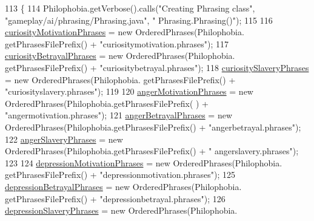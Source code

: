 \begin{DoxyCode}
113                       \{
114         Philophobia.getVerbose().calls(\textcolor{stringliteral}{"Creating Phrasing class"}, \textcolor{stringliteral}{"gameplay/ai/phrasing/Phrasing.java"}, \textcolor{stringliteral}{"
      Phrasing.Phrasing()"});
115 
116         \hyperlink{classgameplay_1_1ai_1_1phrasing_1_1_phrasing_ad82ede6d0263d91e13511606f6696a18}{curiosityMotivationPhrases} = \textcolor{keyword}{new} OrderedPhrases(Philophobia.
      getPhrasesFilePrefix() + \textcolor{stringliteral}{"curiositymotivation.phrases"});
117         \hyperlink{classgameplay_1_1ai_1_1phrasing_1_1_phrasing_a10f436b3727af6eedab39a382801306c}{curiosityBetrayalPhrases} = \textcolor{keyword}{new} OrderedPhrases(Philophobia.
      getPhrasesFilePrefix() + \textcolor{stringliteral}{"curiositybetrayal.phrases"});
118         \hyperlink{classgameplay_1_1ai_1_1phrasing_1_1_phrasing_a2e35ff33685cec980af1454e7f255d06}{curiositySlaveryPhrases} = \textcolor{keyword}{new} OrderedPhrases(Philophobia.
      getPhrasesFilePrefix() + \textcolor{stringliteral}{"curiosityslavery.phrases"});
119         
120         \hyperlink{classgameplay_1_1ai_1_1phrasing_1_1_phrasing_a2fb3c3c2b96efbc4afee915d58967130}{angerMotivationPhrases} = \textcolor{keyword}{new} OrderedPhrases(Philophobia.getPhrasesFilePrefix(
      ) + \textcolor{stringliteral}{"angermotivation.phrases"});
121         \hyperlink{classgameplay_1_1ai_1_1phrasing_1_1_phrasing_a69df7c3975018f12a43f29172bbc5789}{angerBetrayalPhrases} = \textcolor{keyword}{new} OrderedPhrases(Philophobia.getPhrasesFilePrefix() + \textcolor{stringliteral}{
      "angerbetrayal.phrases"});
122         \hyperlink{classgameplay_1_1ai_1_1phrasing_1_1_phrasing_a1c50856055990e9a1c22fd2b364bdf85}{angerSlaveryPhrases} = \textcolor{keyword}{new} OrderedPhrases(Philophobia.getPhrasesFilePrefix() + \textcolor{stringliteral}{"
      angerslavery.phrases"});
123 
124         \hyperlink{classgameplay_1_1ai_1_1phrasing_1_1_phrasing_a7134cba12ee037a9737e6e5dcdc02ba8}{depressionMotivationPhrases} = \textcolor{keyword}{new} OrderedPhrases(Philophobia.
      getPhrasesFilePrefix() + \textcolor{stringliteral}{"depressionmotivation.phrases"});
125         \hyperlink{classgameplay_1_1ai_1_1phrasing_1_1_phrasing_a1ab28780f3cb894c496ebd26185493aa}{depressionBetrayalPhrases} = \textcolor{keyword}{new} OrderedPhrases(Philophobia.
      getPhrasesFilePrefix() + \textcolor{stringliteral}{"depressionbetrayal.phrases"});
126         \hyperlink{classgameplay_1_1ai_1_1phrasing_1_1_phrasing_ab8f4fdd33f163351fb6ff578cb950a44}{depressionSlaveryPhrases} = \textcolor{keyword}{new} OrderedPhrases(Philophobia.

\end{DoxyCode}
